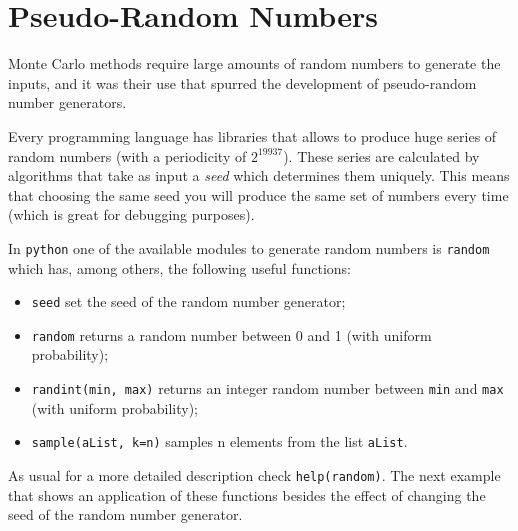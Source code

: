 \section{Pseudo-Random Numbers}\label{pseudo-random-numbers}

Monte Carlo methods require large amounts of random numbers to
generate the inputs, and it was their use that spurred the development
of pseudo-random number generators. 

Every programming language has libraries that
allows to produce huge series of random numbers (with a periodicity of
\(2^{19937}\)). These series are calculated by algorithms that take as
input a \emph{seed} which determines them uniquely. This means
that choosing the same seed you will produce the same set of numbers
every time (which is great for debugging purposes).

In \texttt{python} one of the available modules to generate random numbers is \texttt{random} which has, among others, the following useful functions:
\begin{itemize}
\tightlist
\item
  \texttt{seed} set the seed of the random number generator;
\item
  \texttt{random} returns a random number between 0 and 1 (with uniform
  probability);
\item
  \texttt{randint(min,\ max)} returns an integer random number between
  \texttt{min} and \texttt{max} (with uniform probability);
\item
  \texttt{sample(aList,\ k=n)} samples n elements from the list
  \texttt{aList}.
\end{itemize}
As usual for a more detailed description check \texttt{help(random)}.
The next example that shows an application of these functions besides the effect of  changing the seed of the random number generator.

